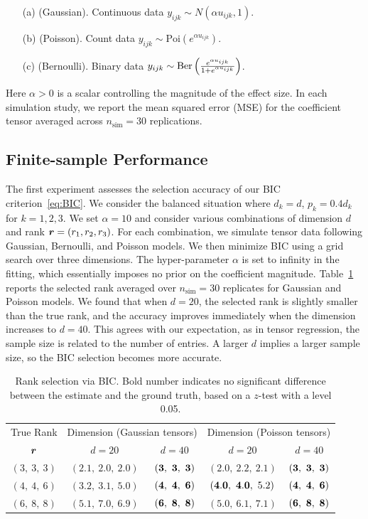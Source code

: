 \documentclass[12pt]{article}
\theoremstyle{plain}
\theoremstyle{definition}
\begin{document}
\begin{enumerate}
\item[(a)] (Gaussian). Continuous data $y_{ijk}\sim N\left(\alpha u_{ijk}, 1\right)$.
\item[(b)] (Poisson). Count data $y_{ijk}\sim\text{Poi}\left( e^{\alpha u_{ijk}}\right)$.
\item[(c)] (Bernoulli). Binary data $y_{ijk}\sim \text{Ber}\left( {e^{\alpha u_{ijk}} \over 1+e^{\alpha u_{ijk}}}\right)$.
\end{enumerate}
Here $\alpha>0$ is a scalar controlling the magnitude of the effect size. In each simulation study, we report the mean squared error (MSE) for the coefficient tensor averaged across $n_{\text{sim}}=30$ replications. 

\subsection{Finite-sample Performance}

The first experiment assesses the selection accuracy of our BIC criterion~\eqref{eq:BIC}. We consider the balanced situation where $d_k=d$, $p_k=0.4d_k$ for $k=1,2,3$. We set $\alpha=10$ and consider various combinations of dimension $d$ and rank $\bm{r}=(r_1,r_2,r_3)$. For each combination, we simulate tensor data following Gaussian, Bernoulli, and Poisson models. We then minimize BIC using a grid search over three dimensions. The hyper-parameter $\alpha$ is set to infinity in the fitting, which essentially imposes no prior on the coefficient magnitude. Table~\ref{tab:rank} reports the selected rank averaged over $n_{\text{sim}}=30$ replicates for Gaussian and Poisson models. We found that when $d=20$, the selected rank is slightly smaller than the true rank, and the accuracy improves immediately when the dimension increases to $d=40$. This agrees with our expectation, as in tensor regression, the sample size is related to the number of entries. A larger $d$ implies a larger sample size, so the BIC selection becomes more accurate. 


\begin{table}[tb]
\centering
\begin{tabular}{|c|cc|cc|}
\hline
True Rank &\multicolumn{2}{c|}{Dimension (Gaussian tensors)}&\multicolumn{2}{c|}{Dimension (Poisson tensors)}\\
$\bm{r}$& $d=20$  &$d=40$&$d=20$ &$d=40$\\
\hline
$(3,\ 3,\ 3)$&$(2.1,\ 2.0,\ 2.0)$&$({\bf 3},\ {\bf 3},\ {\bf 3})$&$(2.0,\ 2.2,\ 2.1)$&$({\bf 3},\ {\bf 3},\ {\bf 3})$\\
$(4,\ 4,\ 6)$&$(3.2,\ 3.1,\ 5.0)$&$({\bf 4},\ {\bf 4},\ {\bf 6})$&$({\bf 4.0},\ {\bf 4.0},\ 5.2)$&$({\bf 4},\ {\bf 4},\ {\bf 6})$\\
$(6,\ 8,\ 8)$&$(5.1,\ 7.0,\ 6.9)$&$({\bf 6},\ {\bf 8},\ {\bf 8})$&$(5.0,\ 6.1,\ 7.1)$&$({\bf 6},\ {\bf 8},\ {\bf 8})$\\
\hline
\end{tabular}
\caption{Rank selection via BIC. Bold number indicates no significant difference between the estimate and the ground truth, based on a $z$-test with a level 0.05.}\label{tab:rank}
\end{table}
\end{document}
